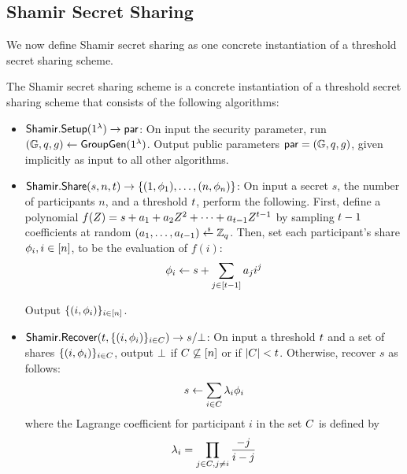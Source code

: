 \subsection{Shamir Secret Sharing}
We now define Shamir secret sharing as one concrete instantiation of a threshold secret sharing scheme.

\begin{definition} \label{defn:shamir}
The Shamir secret sharing scheme is a concrete instantiation of a threshold secret sharing scheme that consists of the following algorithms:

\begin{itemize}
    \item  $\mathsf{Shamir}.\mathsf{Setup}(1^\lambda) \rightarrow \mathsf{par}$:\newline
      On input the security parameter, run $(\mathbb{G}, q, g) \gets \mathsf{GroupGen}(1^\lambda)$.
      Output public parameters $\mathsf{par} = (\mathbb{G}, q, g)$,
      given implicitly as input to all other algorithms.

    \item $\mathsf{Shamir}.\mathsf{Share}(s, n, t) \rightarrow \{ (1, \phi_1), \ldots, (n, \phi_n)\}$:
      On input a secret $s$,
      the number of participants $n$,
      and a threshold $t$, perform the following.
      First, define a polynomial $f(Z) = s + a_1 + a_2 Z^2 + \cdots + a_{t-1} Z^{t-1}$ by sampling $t-1$ coefficients at random $(a_1, \ldots, a_{\tcor}) \randpick \Zq$.
      Then, set each participant's share $\phi_i, i \in [n]$, to be the evaluation of $f(i)$:
    \begin{equation*} \label{eq:issueshares}
        \phi_i \gets s + \sum_{j \in [t-1]} a_j i^j
    \end{equation*}

    Output $\{(i, \phi_i) \}_{i \in [n]}$.

  \item $\mathsf{Shamir}.\mathsf{Recover}(t, \{ (i, \phi_i)\}_{ i \in C}) \rightarrow s/\bot$:
    On input a threshold $t$ and a set of shares $\{(i, \phi_i) \}_{i \in C}$,
    output $\bot$ if $C \not\subseteq [n]$ or if $\lvert C \rvert < t$.
    Otherwise, recover $s$ as follows:
    \begin{equation*} \label{eq:recovershares}
      s \gets \sum_{i \in C} \lambda_i \phi_i
    \end{equation*}
    where the Lagrange coefficient for participant $i$ in the set $C$ is defined by
\[ \lambda_i = \prod_{j \in C, j\neq i} \frac{-j}{i - j} \]
\end{itemize}
\end{definition}

